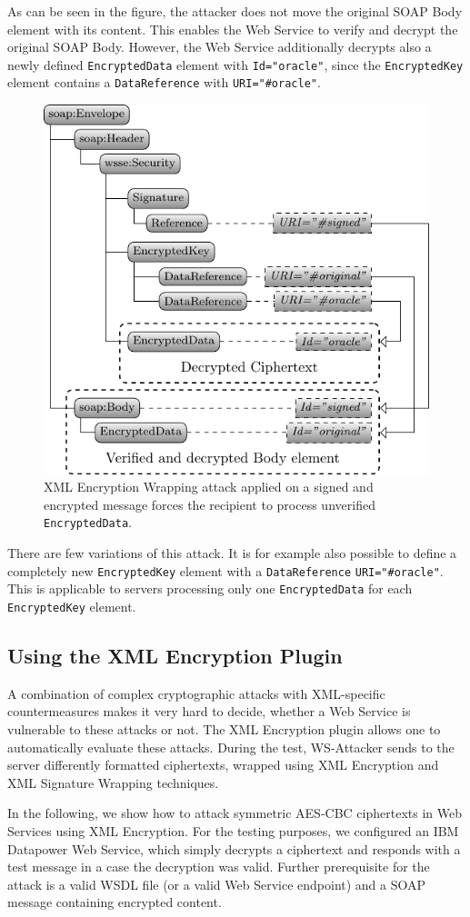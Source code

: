 As can be seen in the figure, the attacker does not move the original SOAP Body element with its content. This enables the Web Service to verify and decrypt the original SOAP Body. However, the Web Service additionally decrypts also a newly defined \texttt{EncryptedData} element with \texttt{Id="oracle"}, since the \texttt{EncryptedKey} element contains a \texttt{DataReference} with \texttt{URI="\#oracle"}. 

\begin{figure}[!ht]
    \centering
    \includegraphics[width=0.55\linewidth]{img/encryption_wrapping}
    \caption{XML Encryption Wrapping attack applied on a signed and encrypted message forces the recipient to process unverified \texttt{EncryptedData}.}
    \label{fig:EncryptionWrapping}
\end{figure}

There are few variations of this attack. It is for example also possible to define a completely new \texttt{EncryptedKey} element with a \texttt{DataReference} \texttt{URI="\#oracle"}. This is applicable to servers processing only one \texttt{EncryptedData} for each \texttt{EncryptedKey} element.


\subsection{Using the XML Encryption Plugin}

A combination of complex cryptographic attacks with XML-specific countermeasures makes it very hard to decide, whether a Web Service is vulnerable to these attacks or not. The XML Encryption plugin allows one to automatically evaluate these attacks. During the test, WS-Attacker sends to the server differently formatted ciphertexts, wrapped using XML Encryption and XML Signature Wrapping techniques. 

In the following, we show how to attack symmetric AES-CBC ciphertexts in Web Services using XML Encryption. For the testing purposes, we configured an IBM Datapower Web Service, which simply decrypts a ciphertext and responds with a test message in a case the decryption was valid. Further prerequisite for the attack is a valid WSDL file (or a valid Web Service endpoint) and a SOAP message containing encrypted content.

